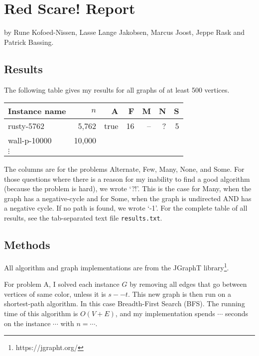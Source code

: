 \documentclass{tufte-handout}
\begin{document}
\section{Red Scare! Report}

by Rune Kofoed-Nissen, Lasse Lange Jakobsen, Marcus Joost, Jeppe Rask and Patrick Bassing.

\subsection{Results}

The following table gives my results for all graphs of at least 500 vertices.

\medskip
\begin{tabular}{lrrrrrr}
  \toprule
  Instance name & $n$ & A & F & M & N & S \\
  \midrule
  rusty-5762 & 5,762 & true & 16 & -- & ? & 5 \\
  wall-p-10000 & 10,000 &\\	
  $\vdots$\\
  \bottomrule
\end{tabular}
\medskip

The columns are for the problems Alternate, Few, Many, None, and Some.
For those questions where there is a reason for my inability to find a good algorithm (because the problem is hard), we wrote `?!'.
This is the case for Many, when the graph has a negative-cycle and for Some, when the graph is undirected AND has a negative cycle.
If no path is found, we wrote `-1'.
For the complete table of all results, see the tab-separated text file {\tt results.txt}.

\subsection{Methods}
All algorithm and graph implementations are from the JGraphT library\footnote{https://jgrapht.org/}.

For problem A, I solved each instance $G$ by removing all edges that go between vertices of same color, unless it is $s -- t$. This new graph is then run on a shortest-path algorithm. In this case Breadth-First Search (BFS).
The running time of this algorithm is $O(V + E)$, and my implementation spends $\cdots$ seconds on the instance $\cdots$ with  $n=\cdots$.
\end{document}
